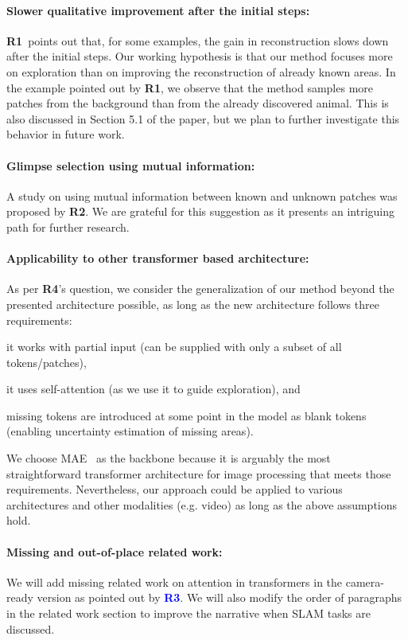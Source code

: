 \documentclass{article}
\newcommand{\Rone}{{\textbf{\textcolor{JungleGreen}{R1}}}}
\newcommand{\Rtwo}{{\textbf{\textcolor{BurntOrange}{R2}}}}
\newcommand{\Rthree}{{\textbf{\textcolor{Blue}{R3}}}}
\newcommand{\Rfour}{{\textbf{\textcolor{RedViolet}{R4}}}}
\begin{document}
\paragraph{Slower qualitative improvement after the initial steps:} \Rone{}~points out that, for some examples, the gain in reconstruction slows down after the initial steps. Our working hypothesis is that our method focuses more on exploration than on improving the reconstruction of already known areas. In the example pointed out by \Rone{}, we observe that the method samples more patches from the background than from the already discovered animal. This is also discussed in Section 5.1 of the paper, but we plan to further investigate this behavior in future work.

\paragraph{Glimpse selection using mutual information:} A study on using mutual information between known and unknown patches was proposed by \Rtwo{}. We are grateful for this suggestion as it presents an intriguing path for further research.

\paragraph{Applicability to other transformer based architecture:}
As per \Rfour{}'s question, we consider the generalization of our method beyond the presented architecture possible, as long as the new architecture follows three requirements: \begin{enumerate*}[label = {\alph*)}]
    \item it works with partial input (can be supplied with only a subset of all tokens/patches),
    \item it uses self-attention (as we use it to guide exploration), and
    \item missing tokens are introduced at some point in the model as blank tokens (enabling uncertainty estimation of missing areas).
\end{enumerate*}
We choose MAE~\cite{he2022masked} as the backbone because it is arguably the most straightforward transformer architecture for image processing that meets those requirements. Nevertheless, our approach could be applied to various architectures and other modalities (e.g. video) as long as the above assumptions hold.

\paragraph{Missing and out-of-place related work:} We will add missing related work on attention in transformers in the camera-ready version as pointed out by \Rthree{}. We will also modify the order of paragraphs in the related work section to improve the narrative when SLAM tasks are discussed.
\end{document}
